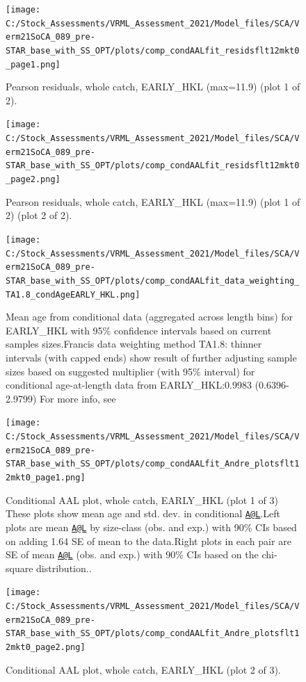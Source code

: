 \documentclass[
  english,
  a4paper,
]{article}
\begin{document}
\begin{figure}
\centering
\texttt{[image: C:/Stock\_Assessments/VRML\_Assessment\_2021/Model\_files/SCA/Verm21SoCA\_089\_pre-STAR\_base\_with\_SS\_OPT/plots/comp\_condAALfit\_residsflt12mkt0\_page1.png]}
\caption{Pearson residuals, whole catch, EARLY\_HKL (max=11.9) (plot 1 of 2).\label{fig:comp_condAALfit_residsflt12mkt0_page1}}
\end{figure}

\begin{figure}
\centering
\texttt{[image: C:/Stock\_Assessments/VRML\_Assessment\_2021/Model\_files/SCA/Verm21SoCA\_089\_pre-STAR\_base\_with\_SS\_OPT/plots/comp\_condAALfit\_residsflt12mkt0\_page2.png]}
\caption{Pearson residuals, whole catch, EARLY\_HKL (max=11.9) (plot 1 of 2) (plot 2 of 2).\label{fig:comp_condAALfit_residsflt12mkt0_page2}}
\end{figure}

\begin{figure}
\centering
\texttt{[image: C:/Stock\_Assessments/VRML\_Assessment\_2021/Model\_files/SCA/Verm21SoCA\_089\_pre-STAR\_base\_with\_SS\_OPT/plots/comp\_condAALfit\_data\_weighting\_TA1.8\_condAgeEARLY\_HKL.png]}
\caption{Mean age from conditional data (aggregated across length bins) for EARLY\_HKL with 95\% confidence intervals based on current samples sizes.Francis data weighting method TA1.8: thinner intervals (with capped ends) show result of further adjusting sample sizes based on suggested multiplier (with 95\% interval) for conditional age-at-length data from EARLY\_HKL:0.9983 (0.6396-2.9799) For more info, see}
\end{figure}

\begin{figure}
\centering
\texttt{[image: C:/Stock\_Assessments/VRML\_Assessment\_2021/Model\_files/SCA/Verm21SoCA\_089\_pre-STAR\_base\_with\_SS\_OPT/plots/comp\_condAALfit\_Andre\_plotsflt12mkt0\_page1.png]}
\caption{Conditional AAL plot, whole catch, EARLY\_HKL (plot 1 of 3)
These plots show mean age and std. dev. in conditional \href{mailto:A@L}{\nolinkurl{A@L}}.Left plots are mean \href{mailto:A@L}{\nolinkurl{A@L}} by size-class (obs. and exp.) with 90\% CIs based on adding 1.64 SE of mean to the data.Right plots in each pair are SE of mean \href{mailto:A@L}{\nolinkurl{A@L}} (obs. and exp.) with 90\% CIs based on the chi-square distribution..\label{fig:comp_condAALfit_Andre_plotsflt12mkt0_page1}}
\end{figure}

\begin{figure}
\centering
\texttt{[image: C:/Stock\_Assessments/VRML\_Assessment\_2021/Model\_files/SCA/Verm21SoCA\_089\_pre-STAR\_base\_with\_SS\_OPT/plots/comp\_condAALfit\_Andre\_plotsflt12mkt0\_page2.png]}
\caption{Conditional AAL plot, whole catch, EARLY\_HKL (plot 2 of 3).\label{fig:comp_condAALfit_Andre_plotsflt12mkt0_page2}}
\end{figure}
\end{document}
